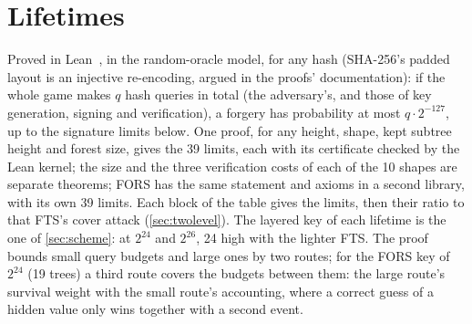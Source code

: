 \documentclass[11pt]{article}
\begin{document}
\section{Lifetimes}
\label{sec:lifetimes}

Proved in Lean~\cite{proofs}, in the random-oracle model, for any hash (SHA-256's padded layout is an injective
re-encoding, argued in the proofs' documentation): if the whole game makes $q$ hash
queries in total (the adversary's, and those of key generation, signing and verification), a forgery has
probability at most $q\cdot2^{-127}$, up to the
signature limits below. One proof, for any height, shape, kept subtree height and forest size, gives the 39 limits, each with its
certificate checked by the Lean kernel; the size and the three verification costs of each of the 10 shapes are
separate theorems; FORS has the same statement and axioms in a second library, with its own 39 limits. Each block of
the table gives the limits, then their ratio to that FTS's cover attack (\cref{sec:twolevel}). The layered key of
each lifetime is the one of \cref{sec:scheme}: at $2^{24}$ and $2^{26}$, 24 high with the lighter FTS. The proof bounds
small query budgets and large ones by two routes; for the FORS key of $2^{24}$ (19 trees) a third route covers the
budgets between them: the large route's survival weight with the small route's accounting, where a correct guess of
a hidden value only wins together with a second event.
\end{document}
